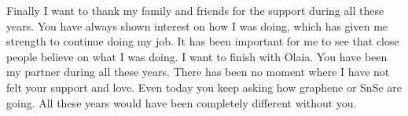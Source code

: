 Finally I want to thank my family and friends for the support during all these years. You have always shown interest 
on how I was doing, which has given me strength to continue doing my job. It has been important for me to see that 
close people believe on what I was doing. I want to finish with Olaia. You have  been my partner during all these 
years. There has been no moment where I have not felt your support and love. Even today you keep asking how graphene 
or SnSe are going. All these years would have been completely different without you. 
